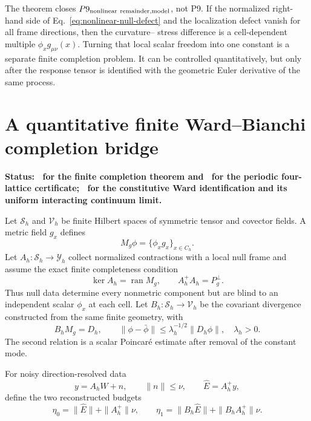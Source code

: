 The theorem closes \(P9_{\rm nonlinear\ remainder,model}\), not P9.  If the
normalized right-hand side of Eq.~\eqref{eq:nonlinear-null-defect} and the
localization defect vanish for all frame directions, then the curvature--
stress difference is a cell-dependent multiple \(\phi_xg_{\mu\nu}(x)\).
Turning that local scalar freedom into one constant is a separate finite
completion problem.  It can be controlled quantitatively, but only after the
response tensor is identified with the geometric Euler derivative of the
same process.

\section{A quantitative finite Ward--Bianchi completion bridge}
\label{sec:ward-bianchi-completion}

\textbf{Status: \StatusAbstract\ for the finite completion theorem and
\StatusNumerical\ for the periodic four-lattice certificate;
\StatusOpen\ for the constitutive Ward identification and its uniform
interacting continuum limit.}

Let \(\mathcal S_h\) and \(\mathcal V_h\) be finite Hilbert spaces of
symmetric tensor and covector fields.  A metric field \(g_x\) defines
\[
 M_g\phi=\{\phi_xg_x\}_{x\in C_h}.
\]
Let \(A_h:\mathcal S_h\to\mathcal Y_h\) collect normalized contractions with
a local null frame and assume the exact finite completeness condition
\begin{equation}
 \ker A_h=\operatorname{ran}M_g,\qquad
 A_h^+A_h=P_g^\perp .
 \label{eq:finite-null-kernel}
\end{equation}
Thus null data determine every nonmetric component but are blind to an
independent scalar \(\phi_x\) at each cell.  Let
\(B_h:\mathcal S_h\to\mathcal V_h\) be the covariant divergence constructed
from the same finite geometry, with
\begin{equation}
 B_hM_g=D_h,\qquad
 \|\phi-\bar\phi\|
 \le\lambda_h^{-1/2}\|D_h\phi\|,
 \quad \lambda_h>0 .
 \label{eq:finite-compatible-poincare}
\end{equation}
The second relation is a scalar Poincar\'e estimate after removal of the
constant mode.

For noisy direction-resolved data
\[
 y=A_hW+n,\qquad \|n\|\le\nu,\qquad
 \widehat E=A_h^+y,
\]
define the two reconstructed budgets
\begin{equation}
 \eta_0=\|\widehat E\|+\|A_h^+\|\nu,\qquad
 \eta_1=\|B_h\widehat E\|+\|B_hA_h^+\|\nu .
 \label{eq:finite-reconstructed-budgets}
\end{equation}

